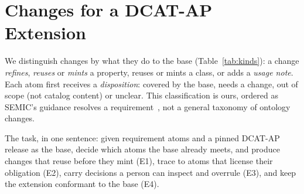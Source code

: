 \section{Changes for a DCAT-AP Extension}\label{sec:problem}

We distinguish changes by what they do to the base (Table~\ref{tab:kinds}): a change \emph{refines}, \emph{reuses} %
or \emph{mints} a property, reuses or mints a class, or adds a \emph{usage note}. Each atom first receives a %
\emph{disposition}: covered by the base, needs a change, out of scope (not catalog content) or unclear. This %
classification is ours, ordered as \ac{SEMIC}'s guidance resolves a requirement~\cite{semicreuse2026}, not a %
general taxonomy of ontology changes.

The task, in one sentence: given requirement atoms and a pinned \acs{DCAT-AP} release as the base, decide which
atoms the base already meets, and produce changes that reuse before they mint (E1), trace to atoms that license
their obligation (E2), carry decisions a person can inspect and overrule (E3), and keep the extension conformant to
the base (E4). %

